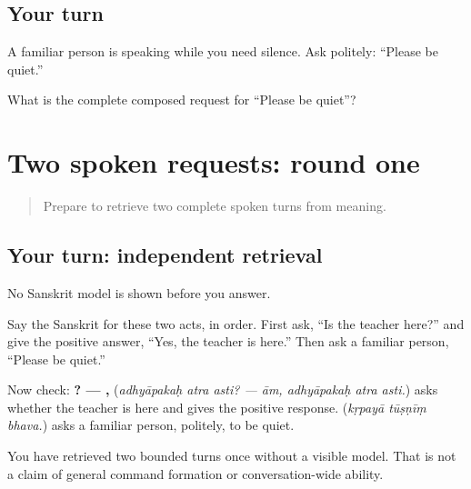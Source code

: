 \subsection*{Your turn}
A familiar person is speaking while you need silence. Ask politely: “Please be quiet.”

\begin{tcolorbox}[breakable,colback=teal!4,colframe=teal!35!black,title={Before you move on}]
What is the complete composed request for “Please be quiet”?
\end{tcolorbox}
\section[(independent spoken-request retrieval …]{Two spoken requests: round one}

\label{lesson:SA-C271-spoken-requests-first-retrieval}



\begin{quote}
Prepare to retrieve two complete spoken turns from meaning.
\end{quote}

\subsection*{Your turn: independent retrieval}
No Sanskrit model is shown before you answer.

Say the Sanskrit for these two acts, in order. First ask, “Is the teacher here?” and give the positive answer, “Yes, the teacher is here.” Then ask a familiar person, “Please be quiet.”

\begin{grammarlens}[title={What you've built: check after answering}]
Now check: \textbf{  ? — ,   } (\emph{adhyāpakaḥ atra asti? — ām, adhyāpakaḥ atra asti.}) asks whether the teacher is here and gives the positive response. \textbf{  } (\emph{kṛpayā tūṣṇīṃ bhava.}) asks a familiar person, politely, to be quiet.
\end{grammarlens}

\begin{tcolorbox}[breakable,colback=teal!4,colframe=teal!35!black,title={Before you move on}]
You have retrieved two bounded turns once without a visible model. That is not a claim of general command formation or conversation-wide ability.
\end{tcolorbox}
